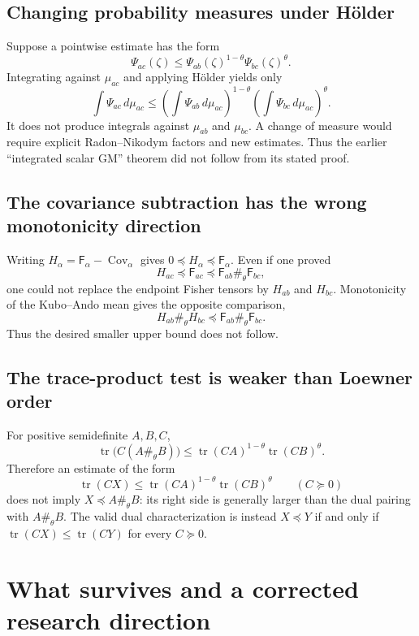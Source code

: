 \documentclass[11pt]{article}
\theoremstyle{definition}
\begin{document}
\subsection{Changing probability measures under H\"older}

Suppose a pointwise estimate has the form
\[
 \Psi_{ac}(\zeta)\le \Psi_{ab}(\zeta)^{1-\theta}\Psi_{bc}(\zeta)^\theta.
\]
Integrating against $\mu_{ac}$ and applying H\"older yields only
\[
 \int\Psi_{ac}\,d\mu_{ac}
 \le
 \left(\int\Psi_{ab}\,d\mu_{ac}\right)^{1-\theta}
 \left(\int\Psi_{bc}\,d\mu_{ac}\right)^\theta.
\]
It does not produce integrals against $\mu_{ab}$ and $\mu_{bc}$.  A change of measure would
require explicit Radon--Nikodym factors and new estimates.  Thus the earlier ``integrated scalar
GM'' theorem did not follow from its stated proof.

\subsection{The covariance subtraction has the wrong monotonicity direction}

Writing $H_\alpha=\mathsf F_\alpha-\operatorname{Cov}_\alpha$ gives
$0\preceq H_\alpha\preceq\mathsf F_\alpha$.  Even if one proved
\[
 H_{ac}\preceq \mathsf F_{ac}
 \preceq \mathsf F_{ab}\#_\theta\mathsf F_{bc},
\]
one could not replace the endpoint Fisher tensors by $H_{ab}$ and $H_{bc}$.  Monotonicity of
the Kubo--Ando mean gives the opposite comparison,
\[
 H_{ab}\#_\theta H_{bc}
 \preceq \mathsf F_{ab}\#_\theta\mathsf F_{bc}.
\]
Thus the desired smaller upper bound does not follow.

\subsection{The trace-product test is weaker than Loewner order}

For positive semidefinite $A,B,C$,
\[
 \operatorname{tr}\bigl(C(A\#_\theta B)\bigr)
 \le
 \operatorname{tr}(CA)^{1-\theta}\operatorname{tr}(CB)^\theta.
\]
Therefore an estimate of the form
\[
 \operatorname{tr}(CX)
 \le \operatorname{tr}(CA)^{1-\theta}\operatorname{tr}(CB)^\theta
 \qquad(C\succeq0)
\]
does not imply $X\preceq A\#_\theta B$: its right side is generally larger than the dual
pairing with $A\#_\theta B$.  The valid dual characterization is instead
$X\preceq Y$ if and only if $\operatorname{tr}(CX)\le\operatorname{tr}(CY)$ for every
$C\succeq0$.

\section{What survives and a corrected research direction}
\end{document}
